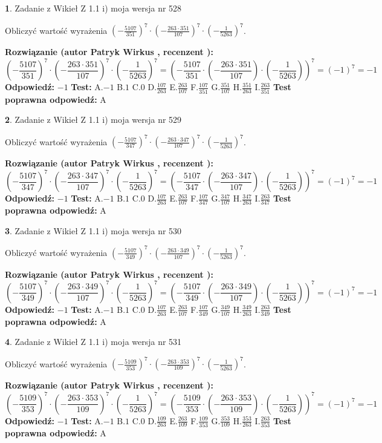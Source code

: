 \documentclass[12pt, a4paper]{article}
\theoremstyle{definition} %
\newtheorem{zad}{}
\newcommand{\zadStart}[1]{\begin{zad}#1\newline}
\newcommand{\zadStop}{\end{zad}}
\newcommand{\rozwStart}[2]{\noindent \textbf{Rozwiązanie (autor #1 , recenzent #2): }\newline}
\newcommand{\rozwStop}{\newline}
\newcommand{\odpStart}{\noindent \textbf{Odpowiedź:}\newline}
\newcommand{\odpStop}{\newline}
\newcommand{\testStart}{\noindent \textbf{Test:}\newline}
\newcommand{\testStop}{\newline}
\newcommand{\kluczStart}{\noindent \textbf{Test poprawna odpowiedź:}\newline}
\newcommand{\kluczStop}{\newline}
\begin{document}
\zadStart{Zadanie z Wikieł Z 1.1 i) moja wersja nr 528}

Obliczyć wartość wyrażenia $(-\frac{5107}{351})^{7} \cdot (-\frac{263 \cdot 351}{107})^{7} \cdot (-\frac{1}{5263})^{7}$.
\zadStop
\rozwStart{Patryk Wirkus}{}
$$(-\frac{5107}{351})^{7} \cdot (-\frac{263 \cdot 351}{107})^{7} \cdot (-\frac{1}{5263})^{7} = (-\frac{5107}{351} \cdot (-\frac{263 \cdot 351}{107}) \cdot (-\frac{1}{5263}))^{7} = (-1)^{7} = -1$$
\rozwStop
\odpStart
$-1$
\odpStop
\testStart
A.$-1$ B.$1$ C.$0$ D.$\frac{107}{263}$ E.$\frac{263}{107}$
F.$\frac{107}{351}$ G.$\frac{351}{107}$
H.$\frac{351}{263}$
I.$\frac{263}{351}$
\testStop
\kluczStart
A
\kluczStop



\zadStart{Zadanie z Wikieł Z 1.1 i) moja wersja nr 529}

Obliczyć wartość wyrażenia $(-\frac{5107}{347})^{7} \cdot (-\frac{263 \cdot 347}{107})^{7} \cdot (-\frac{1}{5263})^{7}$.
\zadStop
\rozwStart{Patryk Wirkus}{}
$$(-\frac{5107}{347})^{7} \cdot (-\frac{263 \cdot 347}{107})^{7} \cdot (-\frac{1}{5263})^{7} = (-\frac{5107}{347} \cdot (-\frac{263 \cdot 347}{107}) \cdot (-\frac{1}{5263}))^{7} = (-1)^{7} = -1$$
\rozwStop
\odpStart
$-1$
\odpStop
\testStart
A.$-1$ B.$1$ C.$0$ D.$\frac{107}{263}$ E.$\frac{263}{107}$
F.$\frac{107}{347}$ G.$\frac{347}{107}$
H.$\frac{347}{263}$
I.$\frac{263}{347}$
\testStop
\kluczStart
A
\kluczStop



\zadStart{Zadanie z Wikieł Z 1.1 i) moja wersja nr 530}

Obliczyć wartość wyrażenia $(-\frac{5107}{349})^{7} \cdot (-\frac{263 \cdot 349}{107})^{7} \cdot (-\frac{1}{5263})^{7}$.
\zadStop
\rozwStart{Patryk Wirkus}{}
$$(-\frac{5107}{349})^{7} \cdot (-\frac{263 \cdot 349}{107})^{7} \cdot (-\frac{1}{5263})^{7} = (-\frac{5107}{349} \cdot (-\frac{263 \cdot 349}{107}) \cdot (-\frac{1}{5263}))^{7} = (-1)^{7} = -1$$
\rozwStop
\odpStart
$-1$
\odpStop
\testStart
A.$-1$ B.$1$ C.$0$ D.$\frac{107}{263}$ E.$\frac{263}{107}$
F.$\frac{107}{349}$ G.$\frac{349}{107}$
H.$\frac{349}{263}$
I.$\frac{263}{349}$
\testStop
\kluczStart
A
\kluczStop



\zadStart{Zadanie z Wikieł Z 1.1 i) moja wersja nr 531}

Obliczyć wartość wyrażenia $(-\frac{5109}{353})^{7} \cdot (-\frac{263 \cdot 353}{109})^{7} \cdot (-\frac{1}{5263})^{7}$.
\zadStop
\rozwStart{Patryk Wirkus}{}
$$(-\frac{5109}{353})^{7} \cdot (-\frac{263 \cdot 353}{109})^{7} \cdot (-\frac{1}{5263})^{7} = (-\frac{5109}{353} \cdot (-\frac{263 \cdot 353}{109}) \cdot (-\frac{1}{5263}))^{7} = (-1)^{7} = -1$$
\rozwStop
\odpStart
$-1$
\odpStop
\testStart
A.$-1$ B.$1$ C.$0$ D.$\frac{109}{263}$ E.$\frac{263}{109}$
F.$\frac{109}{353}$ G.$\frac{353}{109}$
H.$\frac{353}{263}$
I.$\frac{263}{353}$
\testStop
\kluczStart
A
\kluczStop
\end{document}
